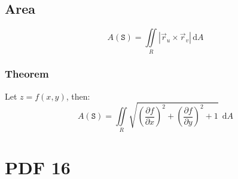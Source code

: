 \documentclass[12pt, fleqn]{book}
\begin{document}
	\section{Area}
		\begin{equation}
			A(\mathtt{S}) = \iint\limits_R \left|\vec{r}_u \times \vec{r}_v\right| \, \mathrm{d}A
		\end{equation}
		\subsection{Theorem}
			Let $z = f(x, y)$, then:
			\begin{equation}
				A(\mathtt{S}) = 
				  \iint\limits_R 
				  \sqrt{
				  	(\frac{\partial f}{\partial x})^2 + 
				  	(\frac{\partial f}{\partial y})^2 + 
				  	1
			  	} 
				  \ \ \mathrm{d}A
			\end{equation}
\chapter{PDF 16}\label{pdf16}
\end{document}
